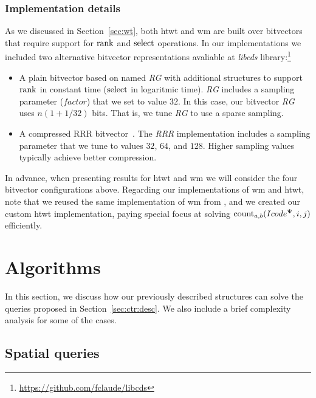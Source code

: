 	\subsubsection{Implementation details} 
	\label{sec:ctr:str:time:imp}
	As we discussed in Section~\ref{sec:wt}, both \gls{htwt} and \gls{wm} are built over bitvectors that require support for $\operatorname{rank}$ and $\operatorname{select}$ operations. In our implementations we included two alternative bitvector representations avaliable
	at {\em libcds} library:{\footnote{\url{https://github.com/fclaude/libcds}}}
	
	\begin{itemize}
		\item A plain bitvector based on \cite{Mun96} named {\em RG} with 
		additional structures to support $\operatorname{rank}$ in constant time ($\operatorname{select}$ in logaritmic time).
		{\em RG} includes a sampling parameter ($factor$) that we set to value $32$. In this case,
		our  bitvector {\em RG} uses $n (1+1/32)$ bits. That is, we tune {\em RG} to use a sparse sampling. 
			
		\item A compressed RRR bitvector~\cite{Raman:2002:SID:545381.545411}. The {\em RRR} implementation includes
		a sampling parameter that we tune to values $32$, $64$, and $128$. Higher sampling values typically achieve better compression.
	\end{itemize}


	In advance, when presenting results for \gls{htwt} and \gls{wm} we will consider the four bitvector configurations
	above. Regarding our implementations of \gls{wm} and \gls{htwt}, note that we reused the same implementation of \gls{wm} from \cite{CNO15}, 
	and we created our custom \gls{htwt} implementation, paying special focus at solving $\operatorname{count}_{a,b}(Icode^{\Psi},i,j)$ efficiently.

\section{Algorithms} \label{sec:ctr:alg}
	In this section, we discuss how our previously described structures can solve the queries proposed in Section~\ref{sec:ctr:desc}. We also include a brief complexity analysis for some of the cases.

	\subsection{Spatial queries}
	\label{sec:ctr:alg:sq}

